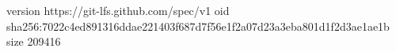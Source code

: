 version https://git-lfs.github.com/spec/v1
oid sha256:7022c4ed891316ddae221403f687d7f56e1f2a07d23a3eba801d1f2d3ae1ae1b
size 209416
